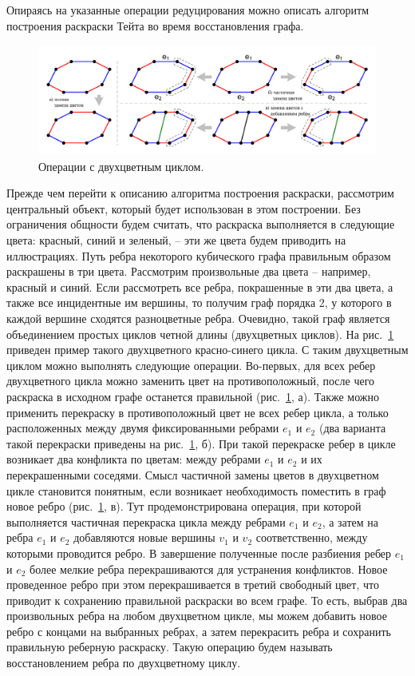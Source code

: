 Опираясь на указанные операции редуцирования можно описать алгоритм построения раскраски Тейта во время восстановления графа.

\begin{figure}[ht]
\centering
\includegraphics[width=1.0\textwidth]{fig/par_edge_col_3_bicyc.pdf}
\singlespacing
{}\caption{Операции с двухцветным циклом.}
\label{fig:par_edge_col_3_bicyc}
\end{figure}

Прежде чем перейти к описанию алгоритма построения раскраски, рассмотрим центральный объект, который будет использован в этом построении.
Без ограничения общности будем считать, что раскраска выполняется в следующие цвета: красный, синий и зеленый, -- эти же цвета будем приводить на иллюстрациях.
Путь ребра некоторого кубического графа правильным образом раскрашены в три цвета.
Рассмотрим произвольные два цвета -- например, красный и синий.
Если рассмотреть все ребра, покрашенные в эти два цвета, а также все инцидентные им вершины, то получим граф порядка 2, у которого в каждой вершине сходятся разноцветные ребра.
Очевидно, такой граф является объединением простых циклов четной длины (двухцветных циклов).
На рис.~\ref{fig:par_edge_col_3_bicyc} приведен пример такого двухцветного красно-синего цикла.
С таким двухцветным циклом можно выполнять следующие операции.
Во-первых, для всех ребер двухцветного цикла можно заменить цвет на противоположный, после чего раскраска в исходном графе останется правильной (рис.~\ref{fig:par_edge_col_3_bicyc}, а).
Также можно применить перекраску в противоположный цвет не всех ребер цикла, а только расположенных между двумя фиксированными ребрами $e_1$ и $e_2$ (два варианта такой перекраски приведены на рис.~\ref{fig:par_edge_col_3_bicyc}, б).
При такой перекраске ребер в цикле возникает два конфликта по цветам: между ребрами $e_1$ и $e_2$ и их перекрашенными соседями.
Смысл частичной замены цветов в двухцветном цикле становится понятным, если возникает необходимость поместить в граф новое ребро (рис.~\ref{fig:par_edge_col_3_bicyc}, в).
Тут продемонстрирована операция, при которой выполняется частичная перекраска цикла между ребрами $e_1$ и $e_2$, а затем на ребра $e_1$ и $e_2$ добавляются новые вершины $v_1$ и $v_2$ соответственно, между которыми проводится ребро.
В завершение полученные после разбиения ребер $e_1$ и $e_2$ более мелкие ребра перекрашиваются для устранения конфликтов.
Новое проведенное ребро при этом перекрашивается в третий свободный цвет, что приводит к сохранению правильной раскраски во всем графе.
То есть, выбрав два произвольных ребра на любом двухцветном цикле, мы можем добавить новое ребро с концами на выбранных ребрах, а затем перекрасить ребра и сохранить правильную реберную раскраску.
Такую операцию будем называть восстановлением ребра по двухцветному циклу.

